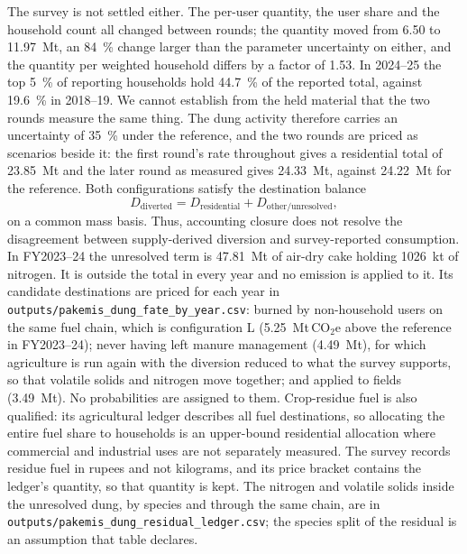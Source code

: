 \documentclass[essd]{copernicus}
\begin{document}
The survey is not settled either. The per-user quantity, the user share and the household count all changed between rounds; the quantity moved from 6.50 to 11.97~Mt, an \SI{84}{\percent} change larger than the parameter uncertainty on either, and the quantity per weighted household differs by a factor of \num{1.53}. In 2024--25 the top \SI{5}{\percent} of reporting households hold \SI{44.7}{\percent} of the reported total, against \SI{19.6}{\percent} in 2018--19. We cannot establish from the held material that the two rounds measure the same thing. The dung activity therefore carries an uncertainty of \SI{35}{\percent} under the reference, and the two rounds are priced as scenarios beside it: the first round's rate throughout gives a residential total of \SI{23.85}{\mega\tonne} and the later round as measured gives \SI{24.33}{\mega\tonne}, against \SI{24.22}{\mega\tonne} for the reference. Both configurations satisfy the destination balance
\begin{equation}
 D_{\mathrm{diverted}}=D_{\mathrm{residential}}
 +D_{\mathrm{other/unresolved}},
 \label{eq:dung_destination}
\end{equation}
on a common mass basis. Thus, accounting closure does not resolve the disagreement between supply-derived diversion and survey-reported consumption. In FY2023--24 the unresolved term is \SI{47.81}{\mega\tonne} of air-dry cake holding \SI{1026}{\kilo\tonne} of nitrogen. It is outside the total in every year and no emission is applied to it. Its candidate destinations are priced for each year in \texttt{outputs/pakemis\_dung\_fate\_by\_year.csv}: burned by non-household users on the same fuel chain, which is configuration L (\SI{5.25}{\mega\tonne}\,CO$_2$e above the reference in FY2023--24); never having left manure management (\SI{4.49}{\mega\tonne}), for which agriculture is run again with the diversion reduced to what the survey supports, so that volatile solids and nitrogen move together; and applied to fields (\SI{3.49}{\mega\tonne}). No probabilities are assigned to them. Crop-residue fuel is also qualified: its agricultural ledger describes all fuel destinations, so allocating the entire fuel share to households is an upper-bound residential allocation where commercial and industrial uses are not separately measured. The survey records residue fuel in rupees and not kilograms, and its price bracket contains the ledger's quantity, so that quantity is kept. The nitrogen and volatile solids inside the unresolved dung, by species and through the same chain, are in \texttt{outputs/pakemis\_dung\_residual\_ledger.csv}; the species split of the residual is an assumption that table declares.
\end{document}

